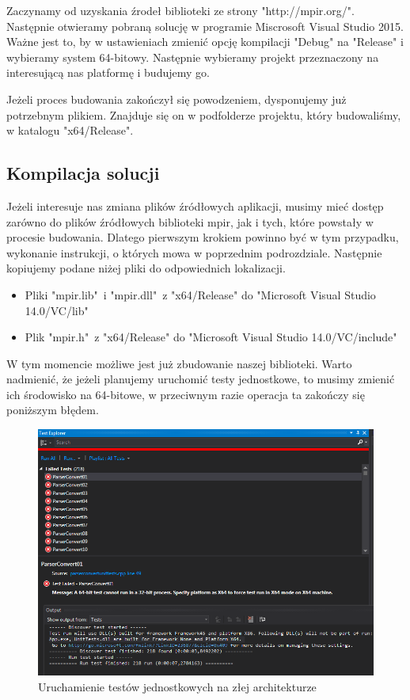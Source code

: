 Zaczynamy od uzyskania źrodeł biblioteki ze strony "http://mpir.org/". Następnie otwieramy pobraną solucję w programie Miscrosoft Visual Studio 2015. Ważne jest to, by w ustawieniach zmienić opcję kompilacji "Debug" na "Release" i wybieramy system 64-bitowy. Następnie wybieramy projekt przeznaczony na interesującą nas platformę i budujemy go.

Jeżeli proces budowania zakończył się powodzeniem, dysponujemy już potrzebnym plikiem. Znajduje się on w podfolderze projektu, który budowaliśmy, w katalogu "x64/Release".

\subsection{Kompilacja solucji}

Jeżeli interesuje nas zmiana plików źródłowych aplikacji, musimy mieć dostęp zarówno do plików źródłowych biblioteki mpir, jak i tych, które powstały w procesie budowania. Dlatego pierwszym krokiem powinno być w tym przypadku, wykonanie instrukcji, o których mowa w poprzednim podrozdziale. Następnie kopiujemy podane niżej pliki do odpowiednich lokalizacji.

\begin{itemize}
	\item Pliki "mpir.lib"\ i "mpir.dll"\ z "x64/Release" do "Microsoft Visual Studio 14.0/VC/lib"
	\item Plik "mpir.h"\ z "x64/Release" do "Microsoft Visual Studio 14.0/VC/include"
\end{itemize}

W tym momencie możliwe jest już zbudowanie naszej biblioteki. Warto nadmienić, że jeżeli planujemy uruchomić testy jednostkowe, to musimy zmienić ich środowisko na 64-bitowe, w przeciwnym razie operacja ta zakończy się poniższym błędem.

\begin{figure}[h]
	\includegraphics[width=15cm]{img/UnitTests_wrong_architecture.png}
	\caption{Uruchamienie testów jednostkowych na złej architekturze}
\end{figure}

